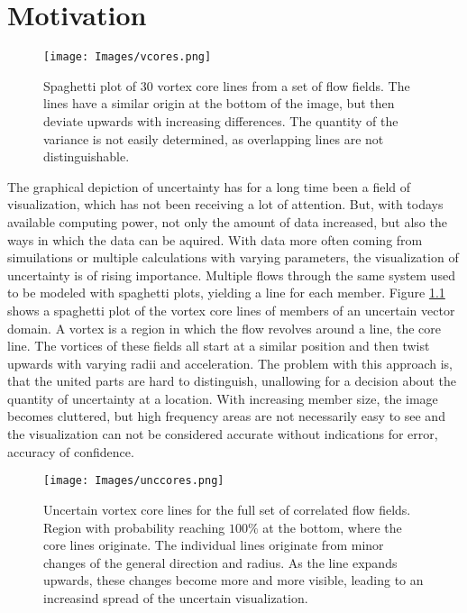 \chapter{Motivation}

\begin{figure}[ht]
    \centering
    \texttt{[image: Images/vcores.png]}
    \caption{Spaghetti plot of 30 vortex core lines from a set of flow
    fields. The lines have a similar origin at the bottom of the image,
    but then deviate upwards with increasing differences. The quantity
    of the variance is not easily determined, as overlapping lines are
    not distinguishable.}
    \label{fig:spaghetti}
\end{figure}
The graphical depiction of uncertainty has for a long time been a field
of visualization, which has not been receiving a lot of attention. But,
with todays available computing power, not only the amount of data
increased, but also the ways in which the data can be aquired. With data
more often coming from simuilations or multiple calculations with
varying parameters, the visualization of uncertainty is of rising
importance. Multiple flows through the same system used to be modeled
with spaghetti plots, yielding a line for each member. Figure
\ref{fig:spaghetti} shows a spaghetti plot of the vortex core lines of
members of an uncertain vector domain. A vortex is a region in which the
flow revolves around a line, the core line. The vortices of these fields
all start at a similar position and then twist upwards with varying
radii and acceleration. The problem with this approach is, that the
united parts are hard to distinguish, unallowing for a decision about
the quantity of uncertainty at a location. With increasing member size,
the image becomes cluttered, but high frequency areas are not
necessarily easy to see and the visualization can not be considered
accurate without indications for error, accuracy of confidence.\\
\begin{figure}[t]
    \centering
    \texttt{[image: Images/unccores.png]}
    \caption{Uncertain vortex core lines for the full set of correlated
    flow fields. Region with probability reaching $100\%$ at the bottom,
    where the core lines originate. The individual lines originate from
    minor changes of the general direction and radius. As the line expands
    upwards, these changes become more and more visible, leading to an
    increasind spread of the uncertain visualization.}
    \label{fig:UVC}
\end{figure}
